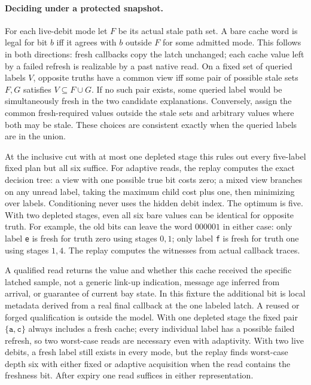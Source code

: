 \documentclass{article}
\begin{document}
\paragraph{Deciding under a protected snapshot.}
For each live-debit mode let $F$ be its actual stale path set. A bare
cache word is legal for bit $b$ iff it agrees with $b$ outside $F$
for some admitted mode. This follows in both directions: fresh
callbacks copy the latch unchanged; each cache value left by a
failed refresh is realizable by a past native read. On a fixed set
of queried labels $V$, opposite truths have a common view iff
some pair of possible stale sets $F,G$ satisfies $V\subseteq F\cup G$.
If no such pair exists, some queried label would be simultaneously
fresh in the two candidate explanations. Conversely, assign the
common fresh-required values outside the stale sets and arbitrary
values where both may be stale. These choices are consistent exactly
when the queried labels are in the union.

At the inclusive cut with at most one depleted stage this rules out
every five-label fixed plan but all six suffice. For adaptive reads,
the replay computes the exact decision tree: a view with one possible
true bit costs zero; a mixed view branches on any unread label,
taking the maximum child cost plus one, then minimizing over labels.
Conditioning never uses the hidden debit index. The optimum is
five. With two depleted stages, even all six bare values can be
identical for opposite truth. For example, the old bits can leave the
word $000001$ in either case: only label \texttt{e} is fresh for
truth zero using stages $0,1$; only label \texttt{f} is fresh for
truth one using stages $1,4$. The replay computes the witnesses
from actual callback traces.

A qualified read returns the value and whether this cache received
the specific latched sample, not a generic link-up indication, message
age inferred from arrival, or guarantee of current bay state. In
this fixture the additional bit is local metadata derived from a
real final callback at the one labeled latch. A reused or forged
qualification is outside the model. With one depleted stage the
fixed pair $\{\texttt{a},\texttt{c}\}$ always includes a fresh cache;
every individual label has a possible failed refresh, so two
worst-case reads are necessary even with adaptivity. With two live
debits, a fresh label still exists in every mode, but the replay
finds worst-case depth six with either fixed or adaptive
acquisition when the read contains the freshness bit.
After expiry one read suffices in either representation.
\end{document}
